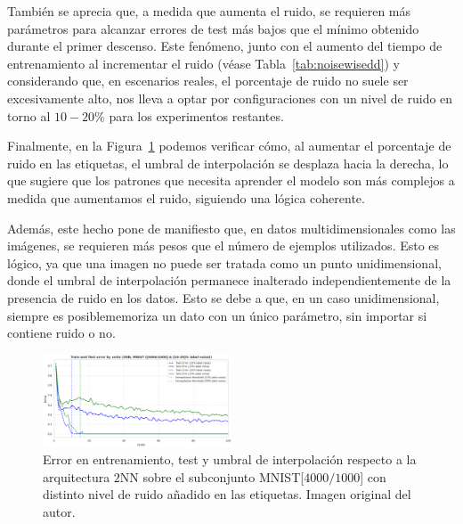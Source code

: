 También se aprecia que, a medida que aumenta el ruido, se requieren más parámetros para alcanzar errores de test más bajos que el mínimo obtenido durante el primer descenso. Este fenómeno, junto con el aumento del tiempo de entrenamiento al incrementar el ruido (véase Tabla~\ref{tab:noisewisedd}) y considerando que, en escenarios reales, el porcentaje de ruido no suele ser excesivamente alto, nos lleva a optar por configuraciones con un nivel de ruido en torno al $10-20\%$ para los experimentos restantes.\newline

Finalmente, en la Figura~\ref{fig:noise-wise-dd3} podemos verificar cómo, al aumentar el porcentaje de ruido en las etiquetas, el umbral de interpolación se desplaza hacia la derecha, lo que sugiere que los patrones que necesita aprender el modelo son más complejos a medida que aumentamos el ruido, siguiendo una lógica coherente.\newline

Además, este hecho pone de manifiesto que, en datos multidimensionales como las imágenes, se requieren más pesos que el número de ejemplos utilizados. Esto es lógico, ya que una imagen no puede ser tratada como un punto unidimensional, donde el umbral de interpolación permanece inalterado independientemente de la presencia de ruido en los datos. Esto se debe a que, en un caso unidimensional, siempre es posiblememoriza un dato con un único parámetro, sin importar si contiene ruido o no.\newline

\begin{figure}[h]
    \centering
    \includegraphics[width=0.5\textwidth]{img/experiments/noise-wise-dd3.png}
    \caption[Umbral de interpolación para el doble descenso con distintos niveles de ruido.]{Error en entrenamiento, test y umbral de interpolación respecto a la arquitectura $2$NN sobre el subconjunto MNIST[$4000/1000$] con distinto nivel de ruido añadido en las etiquetas. Imagen original del autor.}\label{fig:noise-wise-dd3}
\end{figure}


